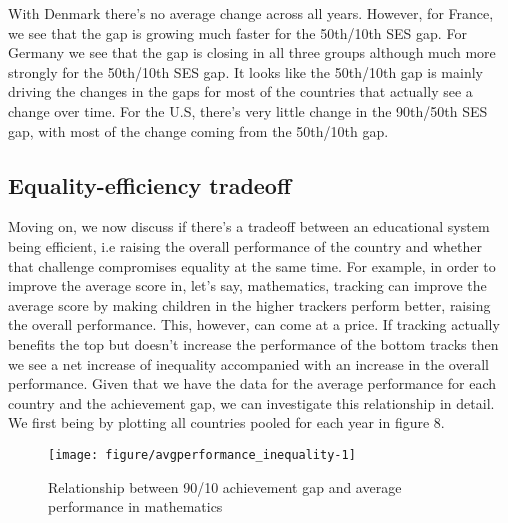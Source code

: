 \documentclass[11pt, a4paper]{article}\usepackage[]{graphicx}\usepackage[]{color}
\begin{document}

With Denmark there's no average change across all years. However, for France, we see that the gap is growing much faster for the 50th/10th SES gap. For Germany we see that the gap is closing in all three groups although much more strongly for the 50th/10th SES gap. It looks like the 50th/10th gap is mainly driving the changes in the gaps for most of the countries that actually see a change over time.  For the U.S, there's very little change in the 90th/50th SES gap, with most of the change coming from the 50th/10th gap.

\subsection{Equality-efficiency tradeoff}

Moving on, we now discuss if there's a tradeoff between an educational system being efficient, i.e raising the overall performance of the country and whether that challenge compromises equality at the same time. For example, in order to improve the average score in, let's say, mathematics, tracking can improve the average score by making children in the higher trackers perform better, raising the overall performance. This, however, can come at a price. If tracking actually benefits the top but doesn't increase the performance of the bottom tracks then we see a net increase of inequality accompanied with an increase in the overall performance. Given that we have the data for the average performance for each country and the achievement gap, we can investigate this relationship in detail. We first being by plotting all countries pooled for each year in figure 8.





\begin{figure}

{\centering \texttt{[image: figure/avgperformance\_inequality-1]} 

}

\caption[Relationship between 90/10 achievement gap and average performance in mathematics]{Relationship between 90/10 achievement gap and average performance in mathematics}\label{fig:avgperformance_inequality}
\end{figure}
\end{document}
